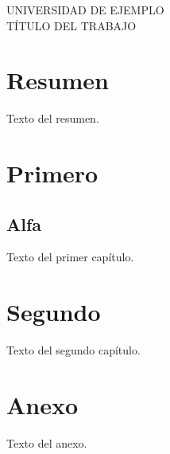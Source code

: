 \documentclass[12pt]{report}
\begin{document}
\begin{titlepage}
\begin{center}
UNIVERSIDAD DE EJEMPLO\\
TÍTULO DEL TRABAJO
\end{center}
\end{titlepage}
\clearpage
{}
\chapter*{Resumen}
Texto del resumen.
\tableofcontents
\clearpage
{}
\chapter{Primero}
\section{Alfa}
Texto del primer capítulo.
\chapter{Segundo}
Texto del segundo capítulo.
\appendix
\chapter{Anexo}
Texto del anexo.
\end{document}
